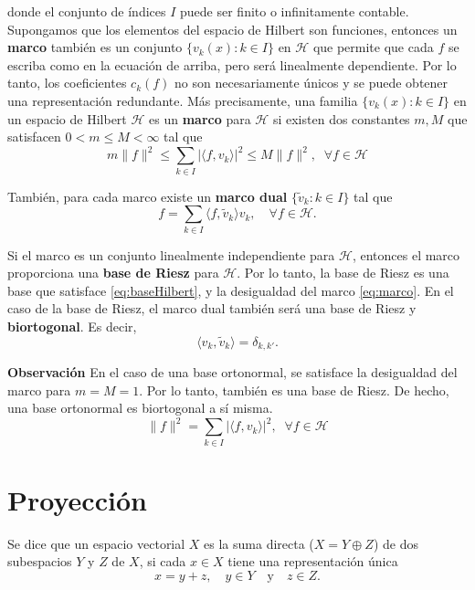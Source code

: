\begin{multicols}{2}
donde el conjunto de índices $I$ puede ser finito o infinitamente contable. Supongamos que los elementos del espacio de Hilbert son funciones, entonces un \textbf{marco} también es un conjunto $\{v_k (x) : k \in I\}$ en $\mathcal{H}$ que permite que cada $f$ se escriba como en la ecuación de arriba, pero será linealmente dependiente. Por lo tanto, los coeficientes $c_k (f)$ no son necesariamente únicos y se puede obtener una representación redundante. Más precisamente, una familia $\{v_k (x) : k \in I\}$ en un espacio de Hilbert $\mathcal{H}$ es un \textbf{marco} para $\mathcal{H}$ si existen dos constantes $m, M$ que satisfacen $0 < m \leq M < \infty$ tal que
\begin{equation}
    m \|f\|^2 \leq \sum_{k \in I} | \langle f, v_k \rangle |^2 \leq M \|f\|^2, \;\; \forall f \in \mathcal{H}
\label{eq:marco}
\end{equation}

También, para cada marco existe un \textbf{marco dual} $\{\tilde{v}_k : k \in I\}$ tal que
\begin{equation}
	f = \sum_{k \in I} \langle f, \tilde{v}_k \rangle v_k, \quad \forall f \in \mathcal{H}.
\label{eq:marco_dual}
\end{equation}

Si el marco es un conjunto linealmente independiente para $\mathcal{H}$, entonces el marco proporciona una \textbf{base de Riesz} para $\mathcal{H}$. Por lo tanto, la base de Riesz es una base que satisface \ref{eq:baseHilbert}, y la desigualdad del marco \ref{eq:marco}. En el caso de la base de Riesz, el marco dual también será una base de Riesz y \textbf{biortogonal}. Es decir,
\begin{equation}
	\langle v_k, \tilde{v}_k\rangle = \delta_{k,k'}.
\label{eq:biortogonal}
\end{equation}

\textbf{Observación}\; En el caso de una base ortonormal, se satisface la desigualdad del marco para $m = M = 1$. Por lo tanto, también es una base de Riesz. De hecho, una base ortonormal es biortogonal a sí misma.
\begin{equation}
     \|f\|^2 = \sum_{k \in I} | \langle f, v_k \rangle |^2, \;\; \forall f \in \mathcal{H}
\label{eq:marco11}
\end{equation}




\section{Proyección}
Se dice que un espacio vectorial $X$ es la suma directa ($X = Y \oplus Z$) de dos subespacios $Y$ y $Z$ de $X$, si cada $x \in X$ tiene una representación única
\begin{equation}
	x = y + z, \quad y \in Y \quad \text{y} \quad z \in Z.
\label{eq:suma_directa}
\end{equation}


\end{multicols}
